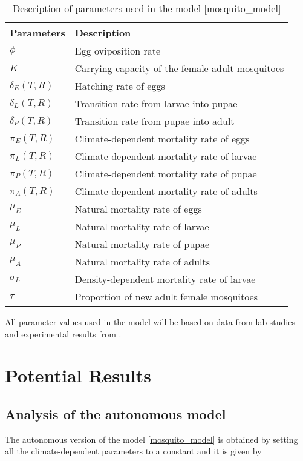 \documentclass[12pt,a4paper,titlepage]{article}
\begin{document}
\begin{table}[h!]
	\begin{center}
		\caption{Description of parameters used in the model \ref{mosquito_model}}
		\label{tab:table2}
		\begin{tabular}{l|l} %
			\hline
			\textbf{Parameters} & \textbf{Description} \\
			\hline
			$\phi$ & Egg oviposition rate \\
			$K$ & Carrying capacity of the female adult mosquitoes \\
			$\delta_E(T, R)$ & Hatching rate of eggs \\
			$\delta_L(T, R)$ & Transition rate from larvae into pupae\\
			$\delta_P(T,R)$ & Transition rate from pupae into adult\\
			$\pi_E(T, R)$ & Climate-dependent mortality rate of eggs\\
			$\pi_L(T, R)$ & Climate-dependent mortality rate of larvae\\
			$\pi_P(T, R)$ & Climate-dependent mortality rate of pupae\\
			$\pi_A(T, R)$ & Climate-dependent mortality rate of adults\\
			$\mu_E$ & Natural mortality rate of eggs\\
			$\mu_L$ & Natural mortality rate of larvae\\
			$\mu_P$ & Natural mortality rate of pupae\\
			$\mu_A$ & Natural mortality rate of adults\\
			$\sigma_L$ & Density-dependent mortality rate of larvae\\
			$\tau$ & Proportion of new adult female mosquitoes \\
		\end{tabular}
	\end{center}
\end{table}

All parameter values used in the model will be based on data from lab studies and experimental results from \cite{bayoh2004temperature, bayoh2003effect, yang2011follow, esteva2015assessing}. 


\section{Potential Results}
\subsection{Analysis of the autonomous model}
The autonomous version of the model \ref{mosquito_model} is obtained by setting all the climate-dependent parameters to a constant and it is given by 
\end{document}
